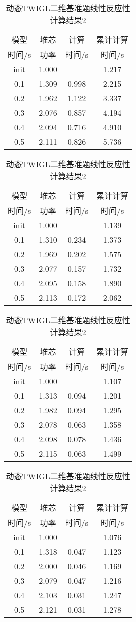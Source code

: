 \begin{table}
\centering
\caption{动态TWIGL二维基准题线性反应性计算结果2\label{tab:testresult.twigl.2.4-8}}
{
\small
\begin{tabular}{cccc}
\toprule
模型 & 堆芯 & 计算 & 累计计算\\
时间/s & 功率 & 时间/s & 时间/s\\
\midrule
init & 1.000 & -- & 1.217\\
0.1 & 1.309 & 0.998 & 2.215\\
0.2 & 1.962 & 1.122 & 3.337\\
0.3 & 2.076 & 0.857 & 4.194\\
0.4 & 2.094 & 0.716 & 4.910\\
0.5 & 2.111 & 0.826 & 5.736\\
\bottomrule
\end{tabular}
}
{
\small
\begin{tabular}{cccc}
\toprule
模型 & 堆芯 & 计算 & 累计计算\\
时间/s & 功率 & 时间/s & 时间/s\\
\midrule
init & 1.000 & -- & 1.139\\
0.1 & 1.310 & 0.234 & 1.373\\
0.2 & 1.969 & 0.202 & 1.575\\
0.3 & 2.077 & 0.157 & 1.732\\
0.4 & 2.095 & 0.158 & 1.890\\
0.5 & 2.113 & 0.172 & 2.062\\
\bottomrule
\end{tabular}
}

{
\small
\begin{tabular}{cccc}
\toprule
模型 & 堆芯 & 计算 & 累计计算\\
时间/s & 功率 & 时间/s & 时间/s\\
\midrule
init & 1.000 & -- & 1.107\\
0.1 & 1.313 & 0.094 & 1.201\\
0.2 & 1.982 & 0.094 & 1.295\\
0.3 & 2.078 & 0.063 & 1.358\\
0.4 & 2.098 & 0.078 & 1.436\\
0.5 & 2.115 & 0.063 & 1.499\\
\bottomrule
\end{tabular}
}
{
\small
\begin{tabular}{cccc}
\toprule
模型 & 堆芯 & 计算 & 累计计算\\
时间/s & 功率 & 时间/s & 时间/s\\
\midrule
init & 1.000 & -- & 1.076\\
0.1 & 1.318 & 0.047 & 1.123\\
0.2 & 2.000 & 0.046 & 1.169\\
0.3 & 2.079 & 0.047 & 1.216\\
0.4 & 2.103 & 0.031 & 1.247\\
0.5 & 2.121 & 0.031 & 1.278\\
\bottomrule
\end{tabular}
}



\end{table}
